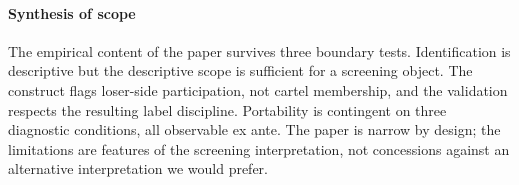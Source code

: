 \paragraph*{Synthesis of scope}
The empirical content of the paper survives three boundary
tests. Identification is descriptive but the descriptive scope
is sufficient for a screening object. The construct flags
loser-side participation, not cartel membership, and the
validation respects the resulting label discipline. Portability
is contingent on three diagnostic conditions, all observable
ex ante. The paper is narrow by design; the limitations are
features of the screening interpretation, not concessions
against an alternative interpretation we would prefer.
